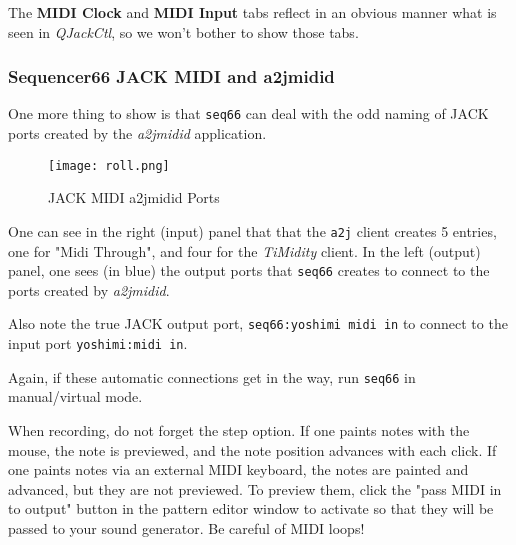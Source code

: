    The \textbf{MIDI Clock} and \textbf{MIDI Input} tabs reflect in an obvious
   manner what is seen in \textsl{QJackCtl}, so we won't bother to show those
   tabs.

\subsubsection{Sequencer66 JACK MIDI and a2jmidid}
\label{subsubsec:seq66_jack_midi_a2jmidid}

   One more thing to show is that \texttt{seq66} can deal with the odd naming
   of JACK ports created by the \textsl{a2jmidid} application.

\begin{figure}[H]
   \centering 
   \texttt{[image: roll.png]}
   \caption{JACK MIDI a2jmidid Ports}
   \label{fig:seq66_a2jmidid_jack_midi}
\end{figure}

   One can see in the right (input) panel that that the \texttt{a2j} client
   creates 5 entries, one for "Midi Through", and four for the
   \textsl{TiMidity} client.
   In the left (output) panel, one sees (in blue) the output
   ports that \texttt{seq66} creates to connect to the ports created by
   \textsl{a2jmidid}.

   Also note the true JACK output port,
   \texttt{seq66:yoshimi midi in} to connect to the input port
   \texttt{yoshimi:midi in}.

   Again, if these automatic connections get in the way, run \texttt{seq66} in
   manual/virtual mode.

   When recording, do not forget the step option.  If one paints notes with the
   mouse, the note is previewed, and the note position advances with each
   click.  If one paints notes via an external MIDI keyboard, the notes are
   painted and advanced, but they are not previewed.  To preview them, click
   the "pass MIDI in to output" button in the pattern editor window to activate
   so that they will be passed to your sound generator.
	Be careful of MIDI loops!

